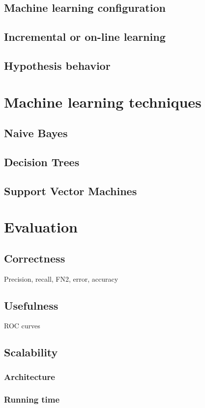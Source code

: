 \subsection{Machine learning configuration}
\subsection{Incremental or on-line learning}
\subsection{Hypothesis behavior}

\section{Machine learning techniques}
\subsection{Naive Bayes}
\subsection{Decision Trees}
\subsection{Support Vector Machines}

\section{Evaluation}
\subsection{Correctness}
Precision, recall, FN2, error, accuracy
\subsection{Usefulness}
ROC curves
\subsection{Scalability}
\subsubsection{Architecture}
\subsubsection{Running time}
